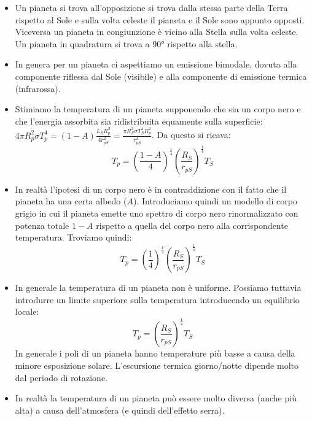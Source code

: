 \documentclass[11pt,a4paper]{article}
\begin{document}
\begin{itemize}
\item Un pianeta si trova all'opposizione si trova dalla stessa parte della Terra rispetto al Sole e sulla volta celeste il pianeta e il Sole sono appunto opposti. Viceversa un pianeta in congiunzione è vicino alla Stella sulla volta celeste. Un pianeta in quadratura si trova a $90 \si{\degree}$ rispetto alla stella.

\item In genera per un pianeta ci aspettiamo un emissione bimodale, dovuta alla componente riflessa dal Sole (visibile) e alla componente di emissione termica (infrarossa).

\item Stimiamo la temperatura di un pianeta supponendo che sia un corpo nero e che l'energia assorbita sia ridistribuita equamente sulla superficie: $4 \pi R_p^2 \sigma T_p^{4} = \left( 1 - A \right) \frac{L_S R_p^{2}}{4 r_{pS}^{2}} = \frac{\pi R_S^{2} \sigma T_{S}^{4} R_p^2}{r_{pS}^2}$. Da questo si ricava:
\begin{equation}
T_p = \left( \frac{1-A}{4} \right)^{\frac{1}{4}} \left( \frac{R_{S}}{r_{pS}} \right) ^{\frac{1}{4}} T_{S} 
\end{equation}

\item In realtà l'ipotesi di un corpo nero è in contraddizione con il fatto che il pianeta ha una certa albedo ($A$). Introduciamo quindi un modello di corpo grigio in cui il pianeta emette uno spettro di corpo nero rinormalizzato con potenza totale $1-A$ rispetto a quella del corpo nero alla corrispondente temperatura. Troviamo quindi:
\begin{equation}
T_p = \left( \frac{1}{4} \right)^{\frac{1}{4}} \left( \frac{R_{S}}{r_{pS}} \right) ^{\frac{1}{4}} T_{S} 
\end{equation}

\item In generale la temperatura di un pianeta non è uniforme. Possiamo tuttavia introdurre un limite superiore sulla temperatura introducendo un equilibrio locale:
\begin{equation}
T_p = \left( \frac{R_{S}}{r_{pS}} \right) ^{\frac{1}{4}} T_{S} 
\end{equation}
In generale i poli di un pianeta hanno temperature più basse a causa della minore esposizione solare. L'escursione termica giorno/notte dipende molto dal periodo di rotazione.

\item In realtà la temperatura di un pianeta può essere molto diversa (anche più alta) a causa dell'atmosfera (e quindi dell'effetto serra). 


\end{itemize}
\end{document}
